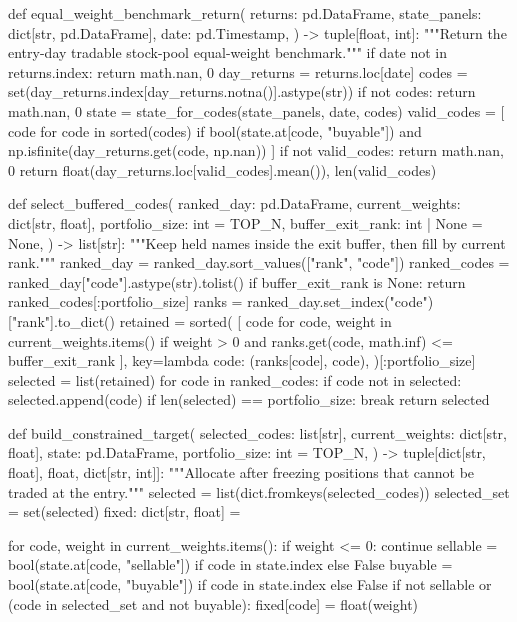 \documentclass[UTF8,a4paper,fontset=fandol]{ctexart}
\begin{document}
\begin{ProjectCode}
def equal_weight_benchmark_return(
    returns: pd.DataFrame,
    state_panels: dict[str, pd.DataFrame],
    date: pd.Timestamp,
) -> tuple[float, int]:
    """Return the entry-day tradable stock-pool equal-weight benchmark."""
    if date not in returns.index:
        return math.nan, 0
    day_returns = returns.loc[date]
    codes = set(day_returns.index[day_returns.notna()].astype(str))
    if not codes:
        return math.nan, 0
    state = state_for_codes(state_panels, date, codes)
    valid_codes = [
        code
        for code in sorted(codes)
        if bool(state.at[code, "buyable"])
        and np.isfinite(day_returns.get(code, np.nan))
    ]
    if not valid_codes:
        return math.nan, 0
    return float(day_returns.loc[valid_codes].mean()), len(valid_codes)


def select_buffered_codes(
    ranked_day: pd.DataFrame,
    current_weights: dict[str, float],
    portfolio_size: int = TOP_N,
    buffer_exit_rank: int | None = None,
) -> list[str]:
    """Keep held names inside the exit buffer, then fill by current rank."""
    ranked_day = ranked_day.sort_values(["rank", "code"])
    ranked_codes = ranked_day["code"].astype(str).tolist()
    if buffer_exit_rank is None:
        return ranked_codes[:portfolio_size]
    ranks = ranked_day.set_index("code")["rank"].to_dict()
    retained = sorted(
        [
            code
            for code, weight in current_weights.items()
            if weight > 0 and ranks.get(code, math.inf) <= buffer_exit_rank
        ],
        key=lambda code: (ranks[code], code),
    )[:portfolio_size]
    selected = list(retained)
    for code in ranked_codes:
        if code not in selected:
            selected.append(code)
        if len(selected) == portfolio_size:
            break
    return selected


def build_constrained_target(
    selected_codes: list[str],
    current_weights: dict[str, float],
    state: pd.DataFrame,
    portfolio_size: int = TOP_N,
) -> tuple[dict[str, float], float, dict[str, int]]:
    """Allocate after freezing positions that cannot be traded at the entry."""
    selected = list(dict.fromkeys(selected_codes))
    selected_set = set(selected)
    fixed: dict[str, float] = {}

    for code, weight in current_weights.items():
        if weight <= 0:
            continue
        sellable = bool(state.at[code, "sellable"]) if code in state.index else False
        buyable = bool(state.at[code, "buyable"]) if code in state.index else False
        if not sellable or (code in selected_set and not buyable):
            fixed[code] = float(weight)


\end{ProjectCode}
\end{document}
